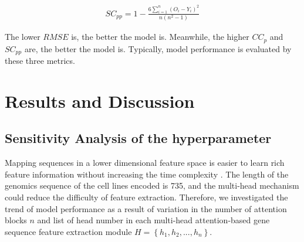 \documentclass{article}
\begin{document}
\begin{align}
    SC_{pp} =1-\frac{6\sum_{i=1}^{n}(O_i-Y_i)^2}{n(n^2-1)}
\end{align}

 The lower $RMSE$ is, the better the model is. Meanwhile, the higher $CC_p$ and $SC_{pp}$ are, the better the model is. Typically, model performance is evaluated by these three metrics.




\section{Results and Discussion}

\subsection{Sensitivity Analysis of the hyperparameter}




Mapping sequences in a lower dimensional feature space is easier to learn rich feature information without increasing the time complexity \cite{attention}. The length of the genomics sequence of the cell lines encoded is 735, and the multi-head mechanism could reduce the difficulty of feature extraction. Therefore, we investigated the trend of model performance as a result of variation in the number of attention blocks $n$ and list of head number in each multi-head attention-based gene sequence feature extraction module $H=\left \{ h_1, h_2,...,h_n \right \}$.



\begin{table}[htbp]
\caption{We show the model evaluation metrics Pearson at different variations of n and h  h when n is determined from 1 to 5.}
\centering
\renewcommand\arraystretch{1.2}

\label{tab:nh}
\end{table}
\end{document}
